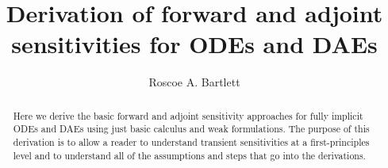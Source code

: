\documentclass[pdf,ps2pdf,11pt]{SANDreport}
\title{
Derivation of forward and adjoint sensitivities for ODEs and DAEs
}
\author{Roscoe A. Bartlett}
\date{}
\begin{document}
\raggedright

\maketitle

%

%
\begin{abstract}
%
Here we derive the basic forward and adjoint sensitivity approaches for fully
implicit ODEs and DAEs using just basic calculus and weak formulations.  The
purpose of this derivation is to allow a reader to understand transient
sensitivities at a first-principles level and to understand all of the
assumptions and steps that go into the derivations.
%
\end{abstract}
%

%
%
%

%
\tableofcontents

\end{document}
